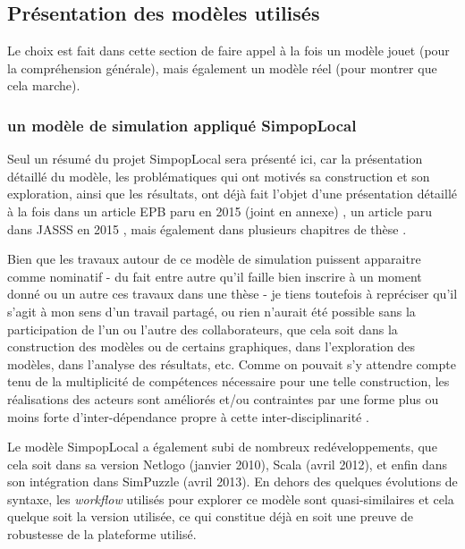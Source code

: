 
\subsection{Présentation des modèles utilisés}

Le choix est fait dans cette section de faire appel à la fois un modèle jouet (pour la compréhension générale), mais également un modèle réel (pour montrer que cela marche).

\subsubsection{un modèle de simulation appliqué SimpopLocal}

Seul un résumé du projet SimpopLocal sera présenté ici, car la présentation détaillé du modèle, les problématiques qui ont motivés sa construction et son exploration, ainsi que les résultats, ont déjà fait l'objet d'une présentation détaillé à la fois dans un article EPB paru en 2015 \autocite{Schmitt2015} (joint en annexe) , un article paru dans JASSS en 2015 \autocite{Reuillon2015}, mais également dans plusieurs chapitres de thèse \autocite{Schmitt2014}.

Bien que les travaux autour de ce modèle de simulation puissent apparaitre comme nominatif - du fait entre autre qu'il faille bien inscrire à un moment donné ou un autre ces travaux dans une thèse - je tiens toutefois à repréciser qu'il s'agit à mon sens d'un travail partagé, ou rien n'aurait été possible sans la participation de l'un ou l'autre des collaborateurs, que cela soit dans la construction des modèles ou de certains graphiques, dans l'exploration des modèles, dans l'analyse des résultats, etc. Comme on pouvait s'y attendre compte tenu de la multiplicité de compétences nécessaire pour une telle construction, les réalisations des acteurs sont améliorés et/ou contraintes par une forme plus ou moins forte d'inter-dépendance propre à cette inter-disciplinarité \autocite{Chapron2014}.

Le modèle SimpopLocal a également subi de nombreux redéveloppements, que cela soit dans sa version Netlogo (janvier 2010), Scala (avril 2012), et enfin dans son intégration dans SimPuzzle (avril 2013). En dehors des quelques évolutions de syntaxe, les \textit{workflow} utilisés pour explorer ce modèle sont quasi-similaires et cela quelque soit la version utilisée, ce qui constitue déjà en soit  une preuve de robustesse de la plateforme utilisé.



